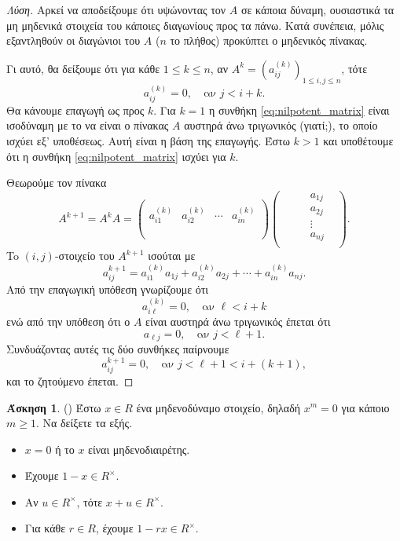 \documentclass[12pt,a4paper,reqno]{amsart}
\theoremstyle{definition}
\newtheorem{exercise}{Άσκηση}
\begin{document}
\begin{proof}[Λύση]
  Αρκεί να αποδείξουμε ότι υψώνοντας τον $A$ σε κάποια δύναμη, ουσιαστικά  τα μη μηδενικά στοιχεία του κάποιες διαγωνίους προς τα πάνω. Κατά συνέπεια, μόλις εξαντληθούν οι διαγώνιοι του $A$ ($n$ το πλήθος) προκύπτει ο μηδενικός πίνακας.

  Γι αυτό, θα δείξουμε ότι για κάθε $1 \le k \le n$, αν $A^k = (a_{ij}^{(k)})_{1\le i, j\le n}$, τότε 
  \begin{equation}
    \label{eq:nilpotent_matrix}
    a_{ij}^{(k)} = 0, \quad \text{αν $j < i+k$}.
  \end{equation}
  Θα κάνουμε επαγωγή ως προς $k$. Για $k=1$ η συνθήκη \eqref{eq:nilpotent_matrix} είναι ισοδύναμη με το να είναι ο πίνακας $A$ αυστηρά άνω τριγωνικός (γιατί;), το οποίο ισχύει εξ' υποθέσεως. Αυτή είναι η βάση της επαγωγής. Έστω $k > 1$ και υποθέτουμε ότι η συνθήκη \eqref{eq:nilpotent_matrix} ισχύει για $k$.

  Θεωρούμε τον πίνακα
  \[
  A^{k+1} = A^{k}A = 
  \begin{pmatrix}
                 &              &           & \\
    a_{i1}^{(k)} & a_{i2}^{(k)} & \cdots    & a_{in}^{(k)} \\
                 &              &           & \\
                 &              &           & \\
  \end{pmatrix}
  \begin{pmatrix}
     & & & a_{1j} & \\
     & & & a_{2j} & \\
     & & & \vdots & \\
     & & & a_{nj} & \\
  \end{pmatrix}.
  \]
  To $(i,j)$-στοιχείο του $A^{k+1}$ ισούται με 
  \[
  a_{ij}^{k+1} = a_{i1}^{(k)}a_{1j} + a_{i2}^{(k)}a_{2j} + \cdots + a_{in}^{(k)}a_{nj}.
  \]
  Από την επαγωγική υπόθεση γνωρίζουμε ότι
  \[
  a_{i\ell}^{(k)} = 0, \quad \text{αν $\ell < i+k$}
  \]
  ενώ από την υπόθεση ότι ο $A$ είναι αυστηρά άνω τριγωνικός έπεται ότι 
  \[
  a_{\ell{j}} = 0, \quad \text{αν $j < \ell+1$}. 
  \]
  Συνδυάζοντας αυτές τις δύο συνθήκες παίρνουμε
  \[
  a_{ij}^{k+1}=0, \quad \text{αν $j < \ell+1 < i + (k+1)$},
  \]
  και το ζητούμενο έπεται.
\end{proof}

\begin{exercise}{\rm(\cite[Ασκήσεις~7.1.14~και~7.4.27]{DF04})}
\label{ex:DF_7.1.14_7.4.27}
Έστω $x \in R$ ένα μηδενοδύναμο στοιχείο, δηλαδή $x^m=0$ για κάποιο $m \ge 1$. Να δείξετε τα εξής.
\begin{itemize}
  \item[(1)] $x=0$ ή το $x$ είναι μηδενοδιαιρέτης.
  \item[(2)] Έχουμε $1-x \in R^\times$.
  \item[(3)] Αν $u \in R^\times$, τότε $x+u \in R^\times$.
  \item[(4)] Για κάθε $r \in R$, έχουμε $1 -rx \in R^\times$.
\end{itemize}
\end{exercise}  
\end{document}
